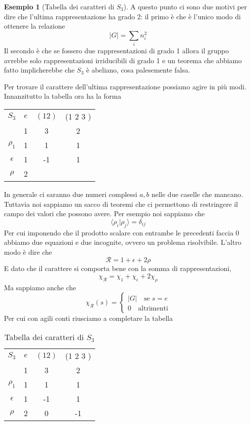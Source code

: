 \documentclass[11pt]{article}
\theoremstyle{plain}
\theoremstyle{definition}
\newtheorem{exmp}{Esempio}[section]
\theoremstyle{remark}
\newcommand{\dsum}{\displaystyle\sum}
\begin{document}
\begin{exmp}[Tabella dei caratteri di $S_3$]
A questo punto ci sono due motivi per dire che l'ultima rappresentazione ha grado 2: il primo è che è l'unico modo di ottenere la relazione
\[ |G | = \dsum_i n_i^2 \]
Il secondo è che se fossero due rappresentazioni di grado 1 allora il gruppo avrebbe solo rappresentazioni irriducibili di grado 1 e un teorema che abbiamo fatto implicherebbe che $S_3$ è abeliano, cosa palesemente falsa.

Per trovare il carattere dell'ultima rappresentazione possiamo agire in più modi. Innanzitutto la tabella ora ha la forma

\begin{table}[!ht]
\centering
\begin{tabular}{|c|c|c|c|}
\hline
$S_3$  & $e$ & $(1 2)$ & (1 2 3 )    \\
 & 1 & 3 & 2 \\
\hline
 $\rho_1$ & 1 & 1  & 1 \\
\hline
$\epsilon$ & 1 & -1 & 1 \\
\hline
$\rho$ & 2 &  & \\
\hline
\end{tabular}
\end{table}

In generale ci saranno due numeri complessi $a, b$ nelle due caselle che mancano. Tuttavia noi sappiamo un sacco di teoremi che ci permettono di restringere il campo dei valori che possono avere. Per esempio noi sappiamo che
\[\langle \rho_i | \rho_j \rangle = \delta_{ij}\]
Per cui imponendo che il prodotto scalare con entrambe le precedenti faccia 0 abbiamo due equazioni e due incognite, ovvero un problema risolvibile. L'altro modo è dire che
\[ \mathcal{R} = 1 + \epsilon + 2\rho\]
E dato che il carattere si comporta bene con la somma di rappresentazioni,
\[\chi_{\mathcal{R}} = \chi_1 + \chi_\epsilon + 2 \chi_\rho  \]
Ma sappiamo anche che
\[ \chi_{\mathcal{R}}(s) =
\begin{cases}
|G| \quad \text{se } s = e \\
0 \quad \text{altrimenti}
\end{cases}\]
Per cui con agili conti riusciamo a completare la tabella

\begin{table}[!ht]
\centering
\begin{tabular}{|c|c|c|c|}
\hline
$S_3$  & $e$ & $(1 2)$ & (1 2 3 )    \\
 & 1 & 3 & 2 \\
\hline
 $\rho_1$ & 1 & 1  & 1 \\
\hline
$\epsilon$ & 1 & -1 & 1 \\
\hline
$\rho$ & 2 & 0 & -1 \\
\hline
\end{tabular}
\caption{Tabella dei caratteri di $S_3$}
\label{tabella caratteri s3}
\end{table}


\end{exmp}
\end{document}
